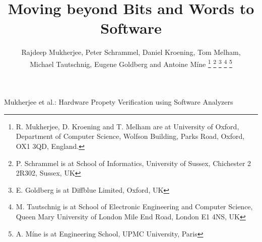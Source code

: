\documentclass[journal]{IEEEtran}
\theoremstyle{definition}
\begin{document}
\title{Moving beyond Bits and Words to Software}
\author{Rajdeep Mukherjee, 
        Peter Schrammel,
        Daniel Kroening, 
        Tom Melham, \\
        Michael Tautschnig,
        Eugene Goldberg and
        Antoine M{\'i}ne
        \thanks{R. Mukherjee, D. Kroening and T. Melham are at 
                University of Oxford, Department of Computer Science,
                Wolfson Building, Parks Road,
                Oxford, OX1 3QD, England.}
        \thanks{P. Schrammel is at School of Informatics, University of Sussex, 
                Chichester 2 2R302, Sussex, UK}
        \thanks{E. Goldberg is at Diffblue Limited, Oxford, UK}
        \thanks{M. Tautschnig is at 
                School of Electronic Engineering and Computer Science,
                Queen Mary University of London
                Mile End Road, London E1 4NS, UK}
        \thanks{A. M{\'i}ne is at Engineering School, UPMC University, Paris}}
%
         {Mukherjee et al.: Hardware Propety Verification using Software Analyzers}

\maketitle
\end{document}
